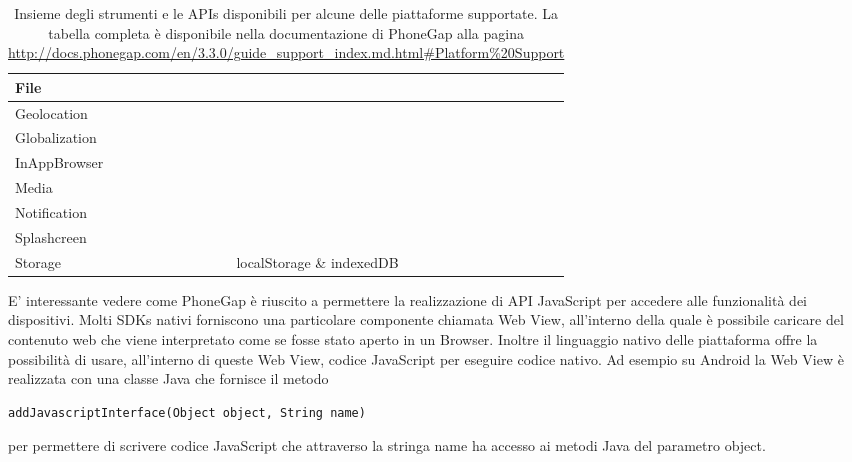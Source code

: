 {\begin{table}
\begin{tabularx}{\textwidth}{|l*{7}{|s}|}
                        \tabularnewline
                        \hline
                        File & \sprt{} & \sprt{} & \sprt{} & \sprt{} & \notsprt{}
                        \tabularnewline
                        \hline
                        Geolocation & \sprt{} & \sprt{} & \sprt{} & \sprt{} & \sprt{}
                        \tabularnewline
                        \hline
                        Globalization & \sprt{} & \notsprt{} & \sprt{} & \sprt{} &
                        \notsprt{}
                        \tabularnewline
                        \hline
                        InAppBrowser & \sprt{} & \sprt{} & \sprt{} & \sprt{} & \notsprt{}
                        \tabularnewline
                        \hline
                        Media & \sprt{} & \sprt{} & \sprt{} & \sprt{} & \sprt{}
                        \tabularnewline
                        \hline
                        Notification & \sprt{} & \sprt{} & \sprt{} & \sprt{} & \sprt{}
                        \tabularnewline
                        \hline
                        Splashcreen & \sprt{} & \sprt{} & \sprt{} & \sprt{} & \notsprt{}
                        \tabularnewline
                        \hline
                        Storage & \sprt{} & \sprt{} & \sprt{} & \sprt{} localStorage
                        \& indexedDB & \notsprt{}
                        \tabularnewline
                        \hline
                    \end{tabularx}
                    \caption{Insieme degli strumenti e le
                    APIs disponibili per alcune delle piattaforme supportate.
                    La tabella completa è disponibile nella documentazione
                    di PhoneGap alla pagina \url{http://docs.phonegap.com/en/3.3.0/guide_support_index.md.html\#Platform\%20Support}}
                    \label{fig:platformsupport}
                \end{table}
            }

            E' interessante vedere come PhoneGap è riuscito a permettere la
            realizzazione di API JavaScript per accedere alle funzionalità
            dei dispositivi.
            Molti SDKs nativi forniscono una particolare componente chiamata
            Web View, all'interno della quale è possibile caricare del contenuto
            web che viene interpretato come se fosse stato aperto in
            un Browser.
            Inoltre il linguaggio nativo delle piattaforma offre la possibilità
            di usare, all'interno di queste Web View, codice JavaScript per
            eseguire codice nativo.
            Ad esempio su Android la Web View è realizzata con una classe Java
            che fornisce il metodo
    \begin{lstlisting}[language=MyJava]
  addJavascriptInterface(Object object, String name)
    \end{lstlisting}
            per permettere
            di scrivere codice JavaScript che attraverso la stringa name ha accesso
            ai metodi Java del parametro object.

